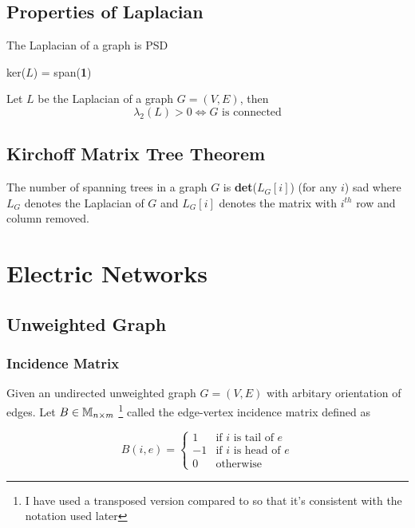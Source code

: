 \subsection{Properties of Laplacian}

\begin{Bf}
 The Laplacian of a graph is PSD
\end{Bf}

\begin{Bf}
 ker($L$) = span(\textbf{1})
\end{Bf}

\begin{Bf}
 Let $L$ be the Laplacian of a graph $G= (V,E)$, then
 $$ \lambda_2(L) > 0 \iff G \text{ is connected}$$
\end{Bf}


\subsection{Kirchoff Matrix Tree Theorem}

\begin{Bf}
 The number of spanning trees in a graph $G$ is \textbf{det}($L_G[i]$) (for any $i$) sad where $L_G$ denotes the Laplacian of $G$ and $L_G[i]$ denotes the matrix with $i^{th}$ row and column removed. 
\end{Bf}


\section{Electric Networks}

\subsection{Unweighted Graph}

\subsubsection{Incidence Matrix} 

Given an undirected unweighted graph $G=(V,E)$ with arbitary orientation of edges. Let $B \in  \mathbb{M}_{n \times m}$ \footnote{I have used a transposed version compared to \citet{TCS-054} so that it's consistent with the notation used later} called the edge-vertex incidence matrix defined as 

\[
    B(i, e) = 
\begin{cases}
 1 & \text{if } i \text{ is tail of } e\\
 -1 & \text{if } i \text{ is head of } e \\
 0 & \text{otherwise}
\end{cases}
\]

